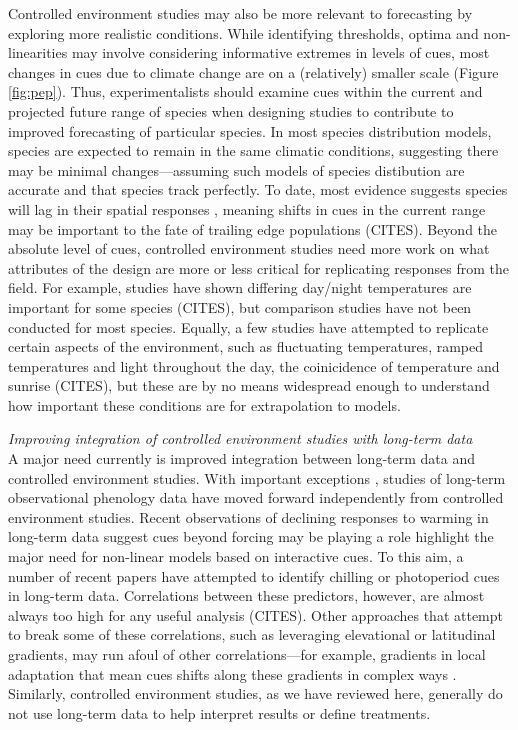 \documentclass[11pt,letter]{article}
\begin{document}
Controlled environment studies may also be more relevant to forecasting by exploring more realistic conditions. While identifying thresholds, optima and non-linearities may involve considering informative extremes in levels of cues, most changes in cues due to climate change are on a (relatively) smaller scale (Figure \ref{fig:pep}). Thus, experimentalists should examine cues within the current and projected future range of species when designing studies to contribute to improved forecasting of particular species. In most species distribution models, species are expected to remain in the same climatic conditions, suggesting there may be minimal changes---assuming such models of species distibution are accurate and that species track perfectly. To date, most evidence suggests species will lag in their spatial responses \citep{Loarie:2009ax}, meaning shifts in cues in the current range may be important to the fate of trailing edge populations (CITES). Beyond the absolute level of cues, controlled environment studies need more work on what attributes of the design are more or less critical for replicating responses from the field. For example, studies have shown differing day/night temperatures are important for some species (CITES), but comparison studies have not been conducted for most species. Equally, a few studies have attempted to replicate certain aspects of the environment, such as fluctuating temperatures, ramped temperatures and light throughout the day, the coinicidence of temperature and sunrise (CITES), but these are by no means widespread enough to understand how important these conditions are for extrapolation to models. 

\emph{Improving integration of controlled environment studies with long-term data}\\
A major need currently is improved integration between long-term data and controlled environment studies. With important exceptions \citep{gauzere2017,fu2019}, studies of long-term observational phenology data have moved forward independently from controlled environment studies. Recent observations of declining responses to warming in long-term data suggest cues beyond forcing may be playing a role \citep{fu2015} highlight the major need for non-linear models based on interactive cues. To this aim, a number of recent papers have attempted to identify chilling or photoperiod cues in long-term data. Correlations between these predictors, however, are almost always too high for any useful analysis (CITES). Other approaches that attempt to break some of these correlations, such as leveraging elevational or latitudinal gradients, may run afoul of other correlations---for example, gradients in local adaptation that mean cues shifts along these gradients in complex ways \citep{tansey2017}. Similarly, controlled environment studies, as we have reviewed here, generally do not use long-term data to help interpret results or define treatments. 
\end{document}
